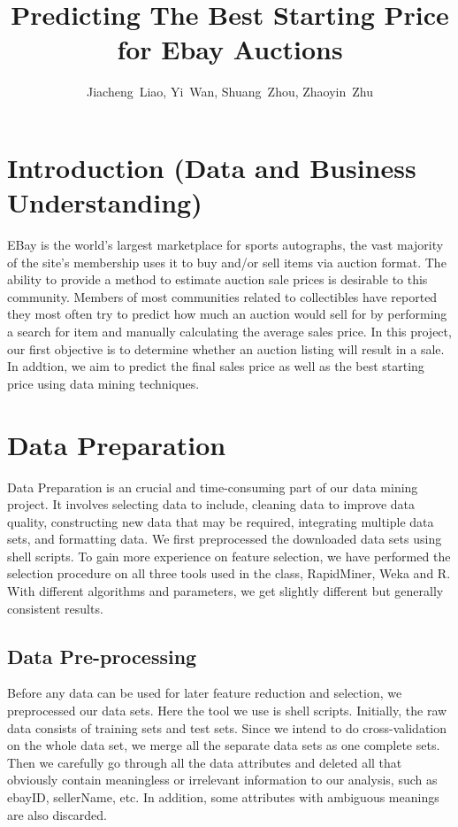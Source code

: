 \documentclass[CEJM,PDF]{cej} %
\title{Predicting The Best Starting Price for Ebay Auctions}
\author{Jiacheng~Liao\inst{1},
        Yi~Wan\inst{1},
        Shuang~Zhou\inst{1},
        Zhaoyin~Zhu\inst{2}
       }
\institute{\inst{1}
           Department of Computer Science, New York University, New York, NY 10012, USA
           \inst{2}
           Division of Biostatistics, NYU School of Medicine, New York, NY 10016, USA
          }
\begin{document}
\maketitle
\section{Introduction (Data and Business Understanding) }

EBay is the world’s largest marketplace for sports autographs, the vast majority of the site’s membership uses it to buy and/or sell items via auction format. The ability to provide a method to estimate auction sale prices is desirable to this community. Members of most communities related to collectibles have reported they most often try to predict how much an auction would sell for by performing a search for item and manually calculating the average sales price. In this project, our first objective is to determine whether an auction listing will result in a sale. In addtion, we aim to predict the final sales price as well as the best starting price using data mining techniques.


\section{Data Preparation}

Data Preparation is an crucial and time-consuming part of our data mining project. It involves selecting data to include, cleaning data to improve data quality, constructing new data that may be required, integrating multiple data sets, and formatting data. We first preprocessed the downloaded data sets using shell scripts. To gain more experience on feature selection, we have performed the selection procedure on all three tools used in the class, RapidMiner, Weka and R. With different algorithms and parameters, we get slightly different but generally consistent results. 

\subsection*{Data Pre-processing}
Before any data can be used for later feature reduction and selection, we preprocessed our data sets. Here the tool we use is shell scripts. Initially, the raw data consists of training sets and test sets. Since we intend to do cross-validation on the whole data set, we merge all the separate data sets as one complete sets. Then we carefully go through all the data attributes and deleted all that obviously contain meaningless or irrelevant information to our analysis, such as ebayID, sellerName, etc. In addition, some attributes with ambiguous meanings are also discarded.
\end{document}
